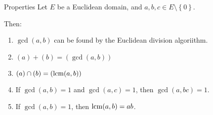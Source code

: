 \documentclass[a4paper]{article}
\begin{document}
\begin{parag}{Properties}
    Let $E$ be a Euclidean domain, and $a, b, c \in E \setminus \left\{0\right\}$.

    Then:
    \begin{enumerate}
        \item $\gcd\left(a, b\right)$ can be found by the Euclidean division algoriithm.
        \item $\left(a\right) + \left(b\right) = \left(\gcd\left(a, b\right)\right)$
        \item $\left(a\right) \cap \left(b\right) = \left(\lcm\left(a, b\right)\right)$
        \item If $\gcd\left(a, b\right) = 1$ and $\gcd\left(a, c\right) = 1$, then $\gcd\left(a, bc\right) = 1$.
        \item If $\gcd\left(a, b\right) = 1$, then $\lcm\left(a, b\right) = ab$.
    \end{enumerate}
\end{parag}
\end{document}
